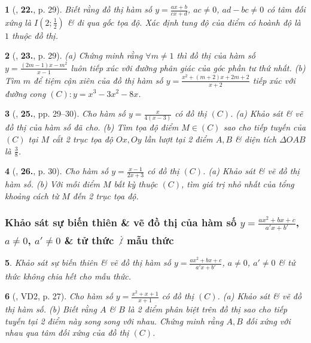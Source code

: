 \documentclass{article}
\newtheorem{baitoan}{}
\begin{document}
\begin{baitoan}[\cite{TLCT_giai_tich_12}, \textbf{22.}, p. 29]
	Biết rằng đồ thị hàm số $y = \frac{ax + b}{cx + d}$, $ac\ne 0$, $ad - bc\ne 0$ có tâm đối xứng là $I\left(2;\frac{1}{2}\right)$ \& đi qua gốc tọa độ. Xác định tung độ của điểm có hoành độ là $1$ thuộc đồ thị.
\end{baitoan}

\begin{baitoan}[\cite{TLCT_giai_tich_12}, \textbf{23.}, p. 29]
	(a) Chứng minh rằng $\forall m\ne 1$ thì đồ thị của hàm số $y = \frac{(2m - 1)x - m^2}{x - 1}$ luôn tiếp xúc với đường phân giác của góc phần tư thứ nhất. (b) Tìm $m$ để tiệm cận xiên của đồ thị hàm số $y = \frac{x^2 + (m + 2)x + 2m + 2}{x + 2}$ tiếp xúc với đường cong $(C):y = x^3 - 3x^2 - 8x$.	
\end{baitoan}

\begin{baitoan}[\cite{TLCT_giai_tich_12}, \textbf{25.}, pp. 29--30]
	Cho hàm số $y = \frac{x}{4(x - 3)}$ có đồ thị $(C)$. (a) Khảo sát \& vẽ đồ thị của hàm số đã cho. (b) Tìm tọa độ điểm $M\in(C)$ sao cho tiếp tuyến của $(C)$ tại $M$ cắt 2 trục tọa độ $Ox,Oy$ lần lượt tại 2 điểm $A,B$ \& diện tích $\Delta OAB$ là $\frac{3}{8}$.	
\end{baitoan}

\begin{baitoan}[\cite{TLCT_giai_tich_12}, \textbf{26.}, p. 30]
	Cho hàm số $y = \frac{x - 1}{2x + 3}$ có đồ thị $(C)$. (a) Khảo sát \& vẽ đồ thị hàm số. (b) Với mỗi điểm $M$ bất kỳ thuộc $(C)$, tìm giá trị nhỏ nhất của tổng khoảng cách từ $M$ đến 2 trục tọa độ.	
\end{baitoan}

\subsubsection{Khảo sát sự biến thiên \& vẽ đồ thị của hàm số $y = \frac{ax^2 + bx + c}{a'x + b'}$, $a\ne 0$, $a'\ne 0$ \& tử thức $\not\vdots$ mẫu thức}

\begin{baitoan}
	Khảo sát sự biến thiên \& vẽ đồ thị hàm số $y = \frac{ax^2 + bx + c}{a'x + b'}$, $a\ne 0$, $a'\ne 0$ \& tử thức không chia hết cho mẫu thức.
\end{baitoan}

\begin{baitoan}[\cite{TLCT_giai_tich_12}, VD2, p. 27]
	Cho hàm số $y = \frac{x^2 + x + 1}{x + 1}$ có đồ thị $(C)$. (a) Khảo sát \& vẽ đồ thị hàm số. (b) Biết rằng $A$ \& $B$ là 2 điểm phân biệt trên đồ thị sao cho tiếp tuyến tại 2 điểm này song song với nhau. Chứng minh rằng $A,B$ đối xứng với nhau qua tâm đối xứng của đồ thị $(C)$.	
\end{baitoan}
\end{document}
